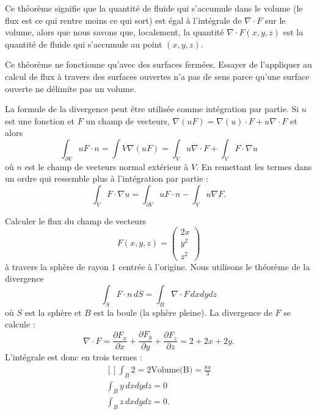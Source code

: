 Ce théorème signifie que la quantité de fluide qui s'accumule dans le volume (le flux est ce qui rentre moins ce qui sort) est égal à l'intégrale de $\nabla\cdot F$ sur le volume, alors que nous savons que, localement, la quantité $\nabla\cdot F(x,y,z)$ est la quantité de fluide qui s'accumule au point $(x,y,z)$.

\begin{remark}
    Ce théorème ne fonctionne qu'avec des surfaces fermées. Essayer de l'appliquer au calcul de flux à travers des surfaces ouvertes n'a pas de sens parce qu'une surface ouverte ne délimite pas un volume.
\end{remark}

\begin{normaltext}
    La formule de la divergence peut être utilisée comme intégration par partie. Si \( u\) est une fonction et \( F\) un champ de vecteurs, \( \nabla(uF)=\nabla(u)\cdot F+u\nabla\cdot F\) et alors
    \begin{equation}
        \int_{\partial V}uF\cdot n=\int V\nabla(uF)=\int_Vu\nabla\cdot F+\int_VF\cdot \nabla u
    \end{equation}
    où \( n\) est le champ de vecteurs normal extérieur à \( V\). En remettant les termes dans un ordre qui ressemble plus à l'intégration par partie :
    \begin{equation}        \label{EQooRUCKooUUrgxI}
        \int_{V}F\cdot \nabla u=\int_{\partial V}uF\cdot n-\int_Vu\nabla F.
    \end{equation}
\end{normaltext}

\begin{example}
    Calculer le flux du champ de vecteurs
    \begin{equation}
        F(x,y,z)=\begin{pmatrix}
            2x    \\
            y^2    \\
            z^2
        \end{pmatrix}
    \end{equation}
    à travers la sphère de rayon $1$ centrée à l'origine. Nous utilisons le théorème de la divergence
    \begin{equation}
        \int_S F\cdot n\,dS=\int_B\nabla \cdot F\,dxdydz
    \end{equation}
    où $S$ est la sphère et $B$ est la boule (la sphère pleine). La divergence de $F$ se calcule :
    \begin{equation}
        \nabla\cdot F=\frac{ \partial F_x }{ \partial x }+\frac{ \partial F_y }{ \partial y }+\frac{ \partial F_z }{ \partial z }=2+2x+2y.
    \end{equation}
    L'intégrale est donc en trois termes :
    \begin{equation}
        \begin{aligned}[]
            \int_B2=2\text{Volume(B)}=\frac{ 8\pi }{ 3 }\\
            \int_By\,dxdydz=0\\
            \int_Bz\,dxdydz=0.
        \end{aligned}
    \end{equation}
\end{example}

